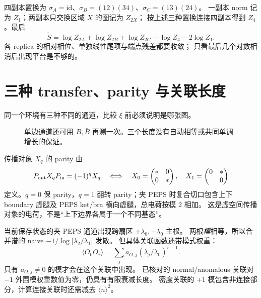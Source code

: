 \documentclass[11pt]{article}
\newcommand{\tS}{\widetilde S}
\begin{document}
四副本置换为 $\sigma_A=\mathrm{id}$、$\sigma_B=(12)(34)$、$\sigma_C=(13)(24)$。
一副本 norm 记为 $Z_1$；两副本只交换区域 $X$ 的图记为 $Z_{2X}$；
按上述三种置换连接四副本得到 $Z_4$。最后
\[
\boxed{\tS=\log Z_{2A}+\log Z_{2B}+\log Z_{2C}-\log Z_4-2\log Z_1.}
\]
各 replica 的相对相位、单独线性尾项与端点残差都要收敛；
只看最后几个对数相消后出现平台是不够的。
\clearpage

\section{三种 transfer、parity 与关联长度}
同一个环境有三种不同的通道，比较 $\xi$ 前必须说明是哪张图。
\begin{figure}[h]\centering
{}
\caption{单边通道还可用 $B,\bar B$ 再测一次。三个长度没有自动相等或共同单调增长的保证。}
\end{figure}

传播对象 $X_q$ 的 parity 由
\[
P_{\rm out}X_qP_{\rm in}=(-1)^qX_q
\quad\Longleftrightarrow\quad
X_0=\begin{pmatrix}* &0\\0&*\end{pmatrix},\quad
X_1=\begin{pmatrix}0&*\\*&0\end{pmatrix}
\]
定义。$q=0$ 保 parity，$q=1$ 翻转 parity；夹 PEPS 时复合切口包含上下 boundary
虚腿及 PEPS ket/bra 横向虚腿，总电荷按模 2 相加。
这是虚空间传播对象的电荷，不是“上下边界各属于一个不同基态”。

当前保存状态的夹 PEPS 通道出现跨扇区 $+\lambda_0,-\lambda_0$ 主根。
两根\emph{模}相等，所以合并谱的 naive $-1/\log|\lambda_2/\lambda_1|$ 发散。
但具体关联函数还带模式权重：
\[
\langle O_0O_r\rangle=\sum_j a_{O,j}(\lambda_j/\lambda_0)^{r-1}.
\]
只有 $a_{O,j}\ne0$ 的模才会在这个关联中出现。
已核对的 normal/anomalous 关联对 $-1$ 外围模权重数值为零，仍具有有限衰减长度。
密度关联的 $+1$ 模包含非连接部分，计算连接关联时还需减去 $\langle n\rangle^2$。
\end{document}
